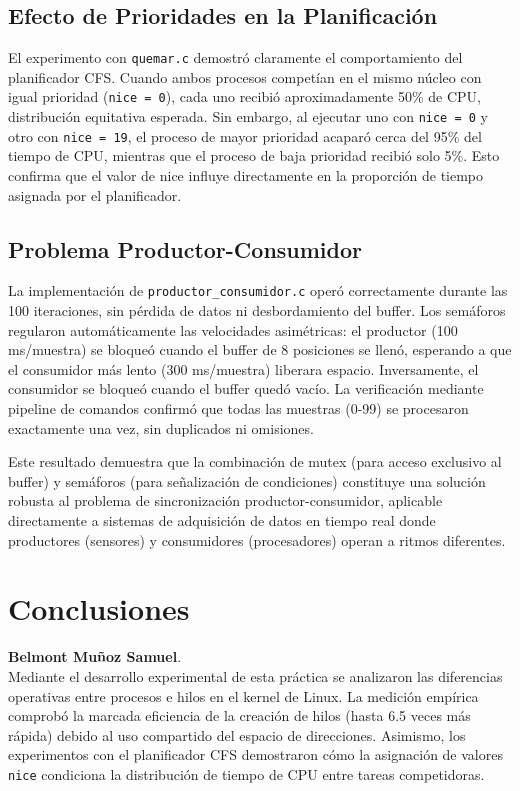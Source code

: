 \documentclass[conference]{IEEEtran}
\begin{document}
\subsection{Efecto de Prioridades en la Planificación}

El experimento con \texttt{quemar.c} demostró claramente el comportamiento del planificador CFS. Cuando ambos procesos competían en el mismo núcleo con igual prioridad (\texttt{nice = 0}), cada uno recibió aproximadamente 50\% de CPU, distribución equitativa esperada. Sin embargo, al ejecutar uno con \texttt{nice = 0} y otro con \texttt{nice = 19}, el proceso de mayor prioridad acaparó cerca del 95\% del tiempo de CPU, mientras que el proceso de baja prioridad recibió solo 5\%. Esto confirma que el valor de nice influye directamente en la proporción de tiempo asignada por el planificador.

\subsection{Problema Productor-Consumidor}

La implementación de \texttt{productor\_consumidor.c} operó correctamente durante las 100 iteraciones, sin pérdida de datos ni desbordamiento del buffer. Los semáforos regularon automáticamente las velocidades asimétricas: el productor (100 ms/muestra) se bloqueó cuando el buffer de 8 posiciones se llenó, esperando a que el consumidor más lento (300 ms/muestra) liberara espacio. Inversamente, el consumidor se bloqueó cuando el buffer quedó vacío. La verificación mediante pipeline de comandos confirmó que todas las muestras (0-99) se procesaron exactamente una vez, sin duplicados ni omisiones.

Este resultado demuestra que la combinación de mutex (para acceso exclusivo al buffer) y semáforos (para señalización de condiciones) constituye una solución robusta al problema de sincronización productor-consumidor, aplicable directamente a sistemas de adquisición de datos en tiempo real donde productores (sensores) y consumidores (procesadores) operan a ritmos diferentes.

\section{Conclusiones}

\textbf{Belmont Muñoz Samuel}. \\
Mediante el desarrollo experimental de esta práctica se analizaron las diferencias operativas entre procesos e hilos en el kernel de Linux. La medición empírica comprobó la marcada eficiencia de la creación de hilos (hasta 6.5 veces más rápida) debido al uso compartido del espacio de direcciones. Asimismo, los experimentos con el planificador CFS demostraron cómo la asignación de valores \texttt{nice} condiciona la distribución de tiempo de CPU entre tareas competidoras. 
\end{document}

